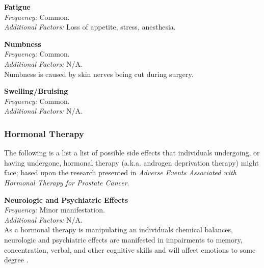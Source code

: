 \documentclass[journal]{vgtc}                %
\begin{document}
                        \textbf{Fatigue}
                        \\ \textit{Frequency:} Common.
                        \\ \textit{Additional Factors:} Loss of appetite, stress, anesthesia.
                        \newline

                        \textbf{Numbness}
                        \\ \textit{Frequency:} Common.
                        \\ \textit{Additional Factors:} N/A.
                        \\ Numbness is caused by skin nerves being cut during surgery.
                        \newline

                        \textbf{Swelling/Bruising}
                        \\ \textit{Frequency:} Common.
                        \\ \textit{Additional Factors:} N/A.
                        \newline



                \subsubsection{Hormonal Therapy}
                        The following is a list a list of possible side effects that individuals undergoing, or having undergone, hormonal therapy (a.k.a. androgen deprivation therapy) might face;  based upon the research presented in \textit{Adverse Events Associated with Hormonal Therapy for Prostate Cancer}\cite{AdverseEvents:2005}.
                        \newline

                        \textbf{Neurologic and Psychiatric Effects}
                        \\ \textit{Frequency:} Minor manifestation.
                        \\ \textit{Additional Factors:} N/A.
                        \\ As a hormonal therapy is manipulating an individuals chemical balances, neurologic and psychiatric effects are manifested in impairments to memory, concentration, verbal, and other cognitive skills and will affect emotions to some degree \cite{AdverseEvents:2005}.
                        \newline
\end{document}
